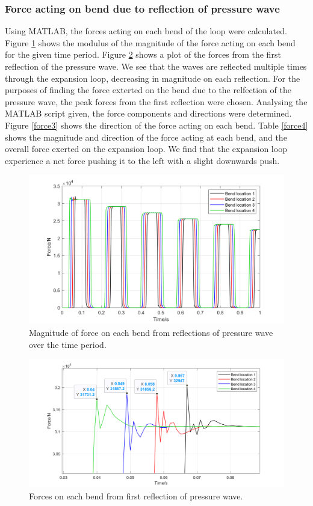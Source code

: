 \subsubsection{Force acting on bend due to reflection of pressure wave}
Using MATLAB, the forces acting on each bend of the loop were calculated. Figure \ref{force2} shows the modulus of the magnitude of the force acting on each bend for the given time period. Figure \ref{force1} shows a plot of the forces from the first reflection of the pressure wave. We see that the waves are reflected multiple times through the expansion loop, decreasing in magnitude on each reflection. For the purposes of finding the force exterted on the bend due to the relfection of the pressure wave, the peak forces from the first reflection were chosen. Analysing the MATLAB script given, the force components and directions were determined. Figure \ref{force3} shows the direction of the force acting on each bend. Table \ref{force4} shows the magnitude and direction of the force acting at each bend, and the overall force exerted on the expansion loop. We find that the expansion loop experience a net force pushing it to the left with a slight downwards push.

\begin{figure}[H]
    \centering
    \includegraphics[width = 0.9 \textwidth]{img/fig6.png}
    \caption{Magnitude of force on each bend from reflections of pressure wave over the time period.}
    \label{force2}
\end{figure}

\begin{figure}[H]
    \centering
    \includegraphics[width = 0.9 \textwidth]{img/fig5.png}
    \caption{Forces on each bend from first reflection of pressure wave.}
    \label{force1}
\end{figure}


